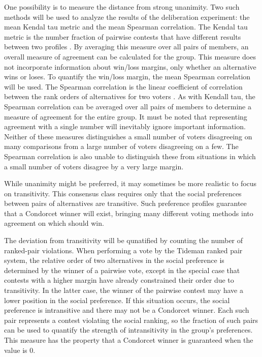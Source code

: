 One possibility is to measure the distance from strong unanimity.
Two such methods will be used to analyze the results of the deliberation experiment:
the mean Kendal tau metric and the mean Spearman correlation.
The Kendal tau metric is the number fraction of pairwise contests that have
different results between two profiles \cite{kendall_new_1938}.
By averaging this measure over all pairs of members, an overall measure of agreement can be calculated for the group.
This measure does not incorporate information about win/loss margins,
only whether an alternative wins or loses.
To quantify the win/loss margin, the mean Spearman correlation will be used.
The Spearman correlation is the linear coefficient of correlation between the
rank orders of alternatives for two voters \cite{spearman_proof_1904}.
As with Kendall tau, the Spearman correlation can be averaged over all pairs of
members to determine a measure of agreement for the entire group.
It must be noted that representing agreement with a single number will inevitably
ignore important information.
Neither of these measures distinguishes a small number of voters disagreeing
on many comparisons from a large number of voters disagreeing on a few.
The Spearman correlation is also unable to distinguish these from situations in
which a small number of voters disagree by a very large margin.

While unanimity might be preferred,
it may sometimes be more realistic to focus on transitivity.
This consensus class requires only that the social preferences between pairs
of alternatives are transitive.
Such preference profiles guarantee that a Condorcet winner will exist,
bringing many different voting methods into agreement on which should win.

The deviation from transitivity will be qunatified by counting the number
of ranked-pair violations.
When performing a vote by the Tideman ranked pair system,
the relative order of two alternatives in the social preference is
determined by the winner of a pairwise vote,
except in the special case that contests with a higher margin have already
constrained their order due to transitivity.
In the latter case, the winner of the pairwise contest may have a lower
position in the social preference.
If this situation occurs, the social preference is intransitive and there may
not be a Condorcet winner.
Each such pair represents a contest violating the social ranking,
so the fraction of such pairs
can be used to quantify the strength of intransitivity in the group’s preferences.
This measure has the property that a Condorcet winner is guaranteed when the value is 0.



